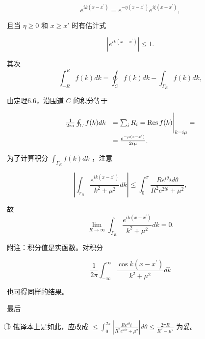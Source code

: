 \begin{equation*}
e ^ {i k (x - x ^ {\prime})} = e ^ {- \eta (x - x ^ {\prime})} e ^ {i \xi (x - x ^ {\prime})},
\end{equation*}

且当 $\eta \geqslant 0$ 和 $x \geqslant x'$ 时有估计式

\begin{equation*}
\left| e ^ {i k \left(x - x ^ {\prime}\right)} \right| \leqslant 1.
\end{equation*}

其次
\begin{equation*}
\int_ {- R} ^ {R} f (k) d k = \oint_ {C} f (k) d k - \int_ {\Gamma_ {R}} f (k) d k,
\end{equation*}

由定理6.6，沿围道 $C$ 的积分等于

\begin{equation*}
\begin{array}{r l} \frac {1}{2 \pi i} \oint_ {C} f (k) d k & = \sum_ {i} R _ {i} = \operatorname{Res} f (k) \Bigg | _ {k = i \mu} = \\ & = \frac {e ^ {- \mu (x - x^ {\prime})}}{2 i \mu}. \end{array}
\end{equation*}

为了计算积分 $\int_{\Gamma_R} f(k) dk$ ，注意

\begin{equation*}
\left| \int_ {r _ {R}} \frac {e ^ {i k (x - x ^ {\prime})}}{k ^ {2} + \mu^ {2}} d k \right| \leqslant \int_ {0} ^ {\pi} \frac {R e ^ {i \theta} i d \theta}{R ^ {2} e ^ {2 i \theta} + \mu^ {2}},
\end{equation*}

故
\begin{equation*}
\lim _ {R \rightarrow \infty} \int_ {\Gamma_ {R}} \frac {e ^ {i k (x - x^ {\prime})}}{k ^ {2} + \mu^ {2}} d k = 0.
\end{equation*}

附注：积分值是实函数。对积分

\begin{equation*}
\frac {1}{2 \pi} \int_ {- \infty} ^ {\infty} \frac {\cos k (x - x ^ {\prime})}{k ^ {2} + \mu^ {2}} d k
\end{equation*}

也可得同样的结果。

最后

\textcircled{1} 俄译本上是如此，应改成 $\leqslant \int_{0}^{2\pi}\left|\frac{Re^{i\theta}i}{R^2e^{2i\theta} + \mu^2}\right|d\theta \leqslant \frac{2\pi R}{R^2 - \mu^2}$ 为妥。

